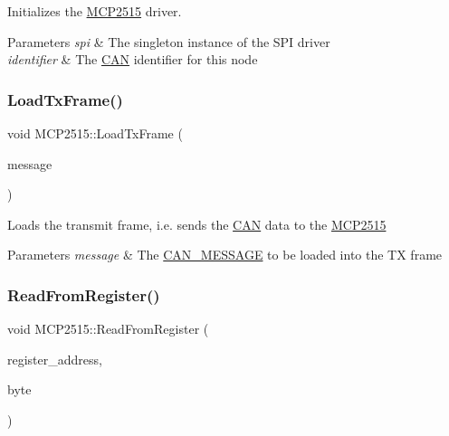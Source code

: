 Initializes the \hyperlink{class_m_c_p2515}{M\+C\+P2515} driver. 
\begin{DoxyParams}{Parameters}
{\em spi} & The singleton instance of the S\+PI driver \\
\hline
{\em identifier} & The \hyperlink{class_c_a_n}{C\+AN} identifier for this node \\
\hline
\end{DoxyParams}
\hypertarget{class_m_c_p2515_a37771e54c401a0d11b16599f4a3b85df}{}\label{class_m_c_p2515_a37771e54c401a0d11b16599f4a3b85df} 
\subsubsection{\texorpdfstring{Load\+Tx\+Frame()}{LoadTxFrame()}}
{\footnotesize\ttfamily void M\+C\+P2515\+::\+Load\+Tx\+Frame (\begin{DoxyParamCaption}\item[{\hyperlink{struct_c_a_n___m_e_s_s_a_g_e}{C\+A\+N\+\_\+\+M\+E\+S\+S\+A\+GE} \&}]{message }\end{DoxyParamCaption})\hspace{0.3cm}{\ttfamily [private]}}

Loads the transmit frame, i.\+e. sends the \hyperlink{class_c_a_n}{C\+AN} data to the \hyperlink{class_m_c_p2515}{M\+C\+P2515} 
\begin{DoxyParams}{Parameters}
{\em message} & The \hyperlink{struct_c_a_n___m_e_s_s_a_g_e}{C\+A\+N\+\_\+\+M\+E\+S\+S\+A\+GE} to be loaded into the TX frame \\
\hline
\end{DoxyParams}
\hypertarget{class_m_c_p2515_a09ef6973daccbf868d89986e727cfa1b}{}\label{class_m_c_p2515_a09ef6973daccbf868d89986e727cfa1b} 
\subsubsection{\texorpdfstring{Read\+From\+Register()}{ReadFromRegister()}}
{\footnotesize\ttfamily void M\+C\+P2515\+::\+Read\+From\+Register (\begin{DoxyParamCaption}\item[{uint8\+\_\+t}]{register\+\_\+address,  }\item[{uint8\+\_\+t \&}]{byte }\end{DoxyParamCaption})\hspace{0.3cm}{\ttfamily [private]}}

